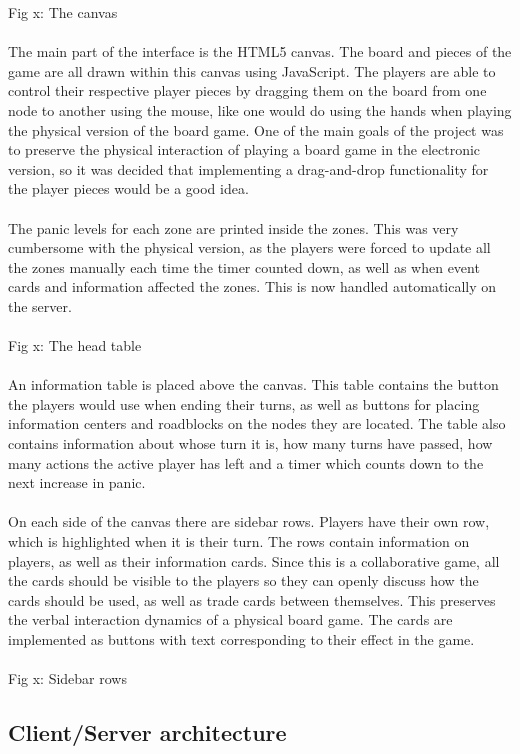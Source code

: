 Fig x: The canvas\\
\\
The main part of the interface is the HTML5 canvas. The board and pieces of the game are all drawn within this canvas using JavaScript. The players are able to control their respective player pieces by dragging them on the board from one node to another using the mouse, like one would do using the hands when playing the physical version of the board game. One of the main goals of the project was to preserve the physical interaction of playing a board game in the electronic version, so it was decided that implementing a drag-and-drop functionality for the player pieces would be a good idea. \\
\\
The panic levels for each zone are printed inside the zones. This was very cumbersome with the physical version, as the players were forced to update all the zones manually each time the timer counted down, as well as when event cards and information affected the zones. This is now handled automatically on the server. \\
\\ %
Fig x: The head table\\
\\
An information table is placed above the canvas. This table contains the button the players would use when ending their turns, as well as buttons for placing information centers and roadblocks on the nodes they are located. The table also contains information about whose turn it is, how many turns have passed, how many actions the active player has left and a timer which counts down to the next increase in panic. \\
\\
On each side of the canvas there are sidebar rows. Players have their own row, which is highlighted when it is their turn. The rows contain information on players, as well as their information cards. Since this is a collaborative game, all the cards should be visible to the players so they can openly discuss how the cards should be used, as well as trade cards between themselves. This preserves the verbal interaction dynamics of a physical board game. The cards are implemented as buttons with text corresponding to their effect in the game. \\
\\ %
Fig x: Sidebar rows



\subsection{Client/Server architecture}


